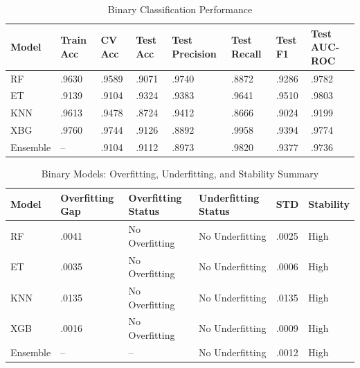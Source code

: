 \documentclass[pdflatex,sn-mathphys-num]{sn-jnl}
\theoremstyle{thmstyleone}%
\theoremstyle{thmstyletwo}%
\theoremstyle{thmstylethree}%
\begin{document}
\begin{table}[htbp]
\centering
\small
\caption{Binary Classification Performance}
\label{BinaryClassifierPerformance}
\renewcommand{\arraystretch}{1.0}
\setlength{\tabcolsep}{4pt}
\begin{tabular}{@{}p{1.3cm}p{1.4cm}p{2.5cm}p{1.2cm}p{1.9cm}p{1.5cm}p{1cm}p{2.1cm}@{}}

\toprule
\textbf{Model} 
& \textbf{Train Acc}
& \textbf{CV Acc} 
& \textbf{Test Acc} 
& \textbf{Test Precision} 
& \textbf{Test Recall} 
& \textbf{Test F1}
& \textbf{Test AUC-ROC} \\
\midrule

RF       & .9630 & .9589 & .9071 & .9740 & .8872 & .9286 & .9782 \\
ET       & .9139 & .9104 & .9324 & .9383 & .9641 & .9510 & .9803 \\
KNN      & .9613 & .9478 & .8724 & .9412 & .8666 & .9024 & .9199 \\
XBG      & .9760 & .9744 & .9126 & .8892 & .9958 & .9394 & .9774 \\
Ensemble & --    & .9104 & .9112 & .8973 & .9820 & .9377 & .9736 \\

\bottomrule
\end{tabular}
\end{table}

\begin{table}[htbp]
\centering
\small
\caption{Binary Models: Overfitting, Underfitting, and Stability Summary}
\label{BinaryStabality}
\renewcommand{\arraystretch}{1.0}
\setlength{\tabcolsep}{4pt}
\begin{tabular}{@{}p{1.3cm}p{2.2cm}p{2.4cm}p{2.8cm}p{1.3cm}p{1.8cm}@{}}
\toprule
\textbf{Model} 
& \textbf{Overfitting Gap} 
& \textbf{Overfitting Status}
& \textbf{Underfitting Status} 
& \textbf{STD} 
& \textbf{Stability} \\
\midrule

RF       & .0041 & No Overfitting & No Underfitting & .0025  & High \\
ET       & .0035 & No Overfitting & No Underfitting & .0006  & High \\
KNN      & .0135 & No Overfitting & No Underfitting & .0135  & High \\
XGB      & .0016 & No Overfitting & No Underfitting & .0009  & High \\
Ensemble & --    & --             & No Underfitting & .0012  & High \\

\bottomrule
\end{tabular}
\end{table}
\end{document}
